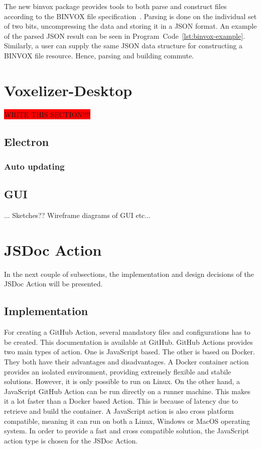 The new binvox package provides tools to both parse and construct files according to the BINVOX file specification~\cite{binvox-file-format}. Parsing is done on the individual set of two bits, uncompressing the data and storing it in a JSON format. An example of the parsed JSON result can be seen in Program~Code~\ref{lst:binvox-example}. Similarly, a user can supply the same JSON data structure for constructing a BINVOX file resource. Hence, parsing and building commute.


\section{Voxelizer-Desktop}
\colorbox{red}{WRITE THIS SECTION!!!!}
\subsection{Electron}
\subsubsection{Auto updating}

\subsection{GUI}
... Sketches?? Wireframe diagrams of GUI etc...


\section{JSDoc Action}
In the next couple of subsections, the implementation and design decisions of the JSDoc Action will be presented.
\subsection{Implementation}
For creating a GitHub Action, several mandatory files and configurations has to be created. This documentation is available at GitHub. GitHub Actions provides two main types of action. One is JavaScript based. The other is based on Docker. They both have their advantages and disadvantages. A Docker container action provides an isolated environment, providing extremely flexible and stabile solutions. However, it is only possible to run on Linux. On the other hand, a JavaScript GitHub Action can be run directly on a runner machine. This makes it a lot faster than a Docker based Action. This is because of latency due to retrieve and build the container. A JavaScript action is also cross platform compatible, meaning it can run on both a Linux, Windows or MacOS operating system. In order to provide a fast and cross compatible solution, the JavaScript action type is chosen for the JSDoc Action.

